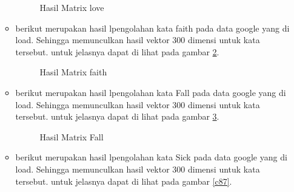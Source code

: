 \begin{enumerate}
\begin{itemize}
\begin{figure}[!htbp]
      \caption{Hasil Matrix love}
      \label{c84}
      \end{figure}

\item berikut merupakan hasil lpengolahan kata faith pada data google yang di load. Sehingga memunculkan hasil vektor 300 dimensi untuk kata tersebut. untuk jelasnya dapat di lihat pada gambar \ref{c85}.

\begin{figure}[!htbp]
      \caption{Hasil Matrix faith}
      \label{c85}
      \end{figure}

\item berikut merupakan hasil lpengolahan kata Fall pada data google yang di load. Sehingga memunculkan hasil vektor 300 dimensi untuk kata tersebut. untuk jelasnya dapat di lihat pada gambar \ref{c86}.

\begin{figure}[!htbp]
      \caption{Hasil Matrix Fall}
      \label{c86}
      \end{figure}

\item berikut merupakan hasil lpengolahan kata Sick pada data google yang di load. Sehingga memunculkan hasil vektor 300 dimensi untuk kata tersebut. untuk jelasnya dapat di lihat pada gambar \ref{c87}.


\end{itemize}
\end{enumerate}
